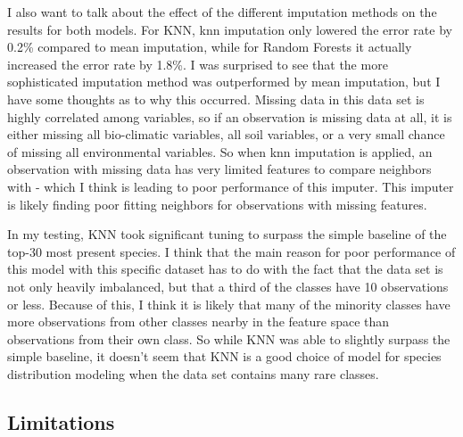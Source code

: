 \documentclass[12pt, oneside]{article}
\begin{document}
\begin{normalsize}
I also want to talk about the effect of the different imputation methods on the results for both models. For KNN, knn imputation only lowered the error rate by 0.2\% compared to mean imputation, while for Random Forests it actually increased the error rate by 1.8\%. I was surprised to see that the more sophisticated imputation method was outperformed by mean imputation, but I have some thoughts as to why this occurred. Missing data in this data set is highly correlated among variables, so if an observation is missing data at all, it is either missing all bio-climatic variables, all soil variables, or a very small chance of missing all environmental variables. So when knn imputation is applied, an observation with missing data has very limited features to compare neighbors with - which I think is leading to poor performance of this imputer. This imputer is likely finding poor fitting neighbors for observations with missing features.

In my testing, KNN took significant tuning to surpass the simple baseline of the top-30 most present species. I think that the main reason for poor performance of this model with this specific dataset has to do with the fact that the data set is not only heavily imbalanced, but that a third of the classes have 10 observations or less. Because of this, I think it is likely that many of the minority classes have more observations from other classes nearby in the feature space than observations from their own class. So while KNN was able to slightly surpass the simple baseline, it doesn't seem that KNN is a good choice of model for species distribution modeling when the data set contains many rare classes.

\subsection{Limitations}


\end{normalsize}
\end{document}
